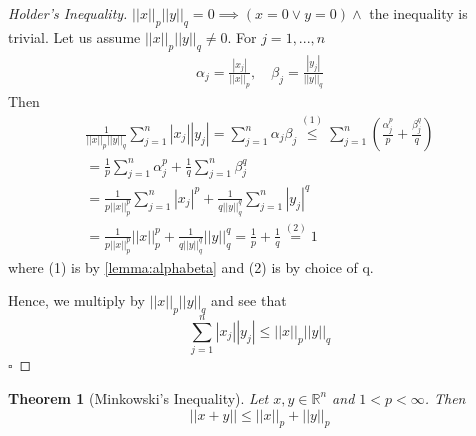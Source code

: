 \documentclass[11pt, oneside]{book}
\theoremstyle{break}
\newtheorem{thm}{Theorem}[section]
\newtheorem*{proof}{Proof}
\newcommand{\bb}[1]{\mathbb{#1}}			%
\newcommand{\qed}{\hfill\ensuremath{\square}}	%
\begin{document}
\begin{proof}[Holder's Inequality]
	$||x||_p ||y||_q = 0 \implies (x = 0 \lor y = 0) \land $ the inequality is trivial. Let us assume $||x||_p ||y||_q \neq 0$. For $j = 1, ..., n$
	\begin{gather*}
		\alpha_j = \frac{|x_j|}{||x||_p}, \quad \beta_j = \frac{|y_j|}{||y||_q}
	\end{gather*}
	Then
	\begin{gather*}
		\frac{1}{||x||_p ||y||_q} \sum_{j=1}^{n} |x_j||y_j| = \sum_{j=1}^{n} \alpha_j \beta_j \overset{(1)}{\leq} \sum_{j=1}^{n} \left( \frac{\alpha_j^p}{p} + \frac{\beta_j^q}{q} \right) \\
		= \frac{1}{p} \sum_{j=1}^{n} \alpha_j^p + \frac{1}{q} \sum_{j=1}^{n} \beta_j^q \\
		= \frac{1}{p||x||_p^p} \sum_{j=1}^{n} |x_j|^p + \frac{1}{q ||y||_q^q} \sum_{j=1}^{n} |y_j|^q \\
		= \frac{1}{p ||x||_p^p} ||x||_p^p + \frac{1}{q ||y||_q^q} ||y||_q^q = \frac{1}{p} + \frac{1}{q} \overset{(2)}{=} 1
	\end{gather*}
	where (1) is by \autoref{lemma:alphabeta} and (2) is by choice of q.

	Hence, we multiply by $||x||_p ||y||_q$ and see that
	\begin{equation}
		\sum_{j=1}^{n} |x_j||y_j| \leq ||x||_p ||y||_q
	\end{equation}\qed
\end{proof}

\begin{thm}[Minkowski's Inequality]\label{thm:minkowski}
	Let $x, y \in \bb{R}^n$ and $1 < p < \infty$. Then
	\begin{equation}
		||x + y|| \leq ||x||_p + ||y||_p
	\end{equation}
\end{thm}
\end{document}
